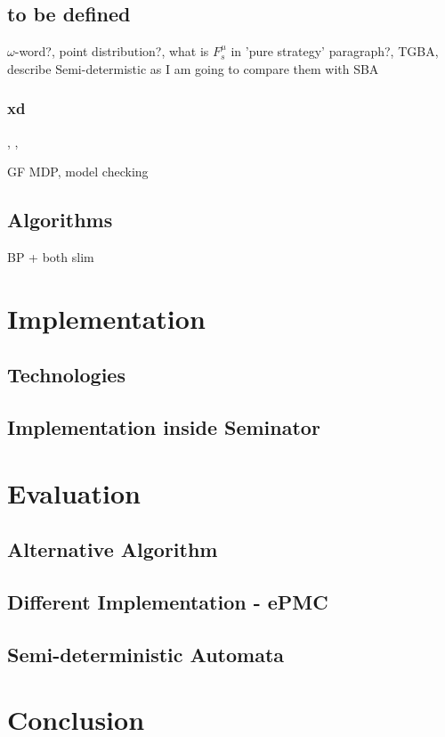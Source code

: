 \documentclass{fithesis3}
\begin{document}
		\section{to be defined}
		$\omega$-word?, point distribution?, what is $F_s^\mu$ in 'pure strategy' paragraph?, TGBA, describe Semi-determistic as I am going to compare them with SBA 
		\subsection{xd}
		
		,
		,
		 
		
		GF MDP, model checking
		\section{Algorithms}
		BP + both slim 
	\chapter{Implementation}
		\section{Technologies}
		\section{Implementation inside Seminator}
	\chapter{Evaluation}
		\section{Alternative Algorithm}
		\section{Different Implementation - ePMC}
		\section{Semi-deterministic Automata}
	\chapter{Conclusion}
\end{document}

